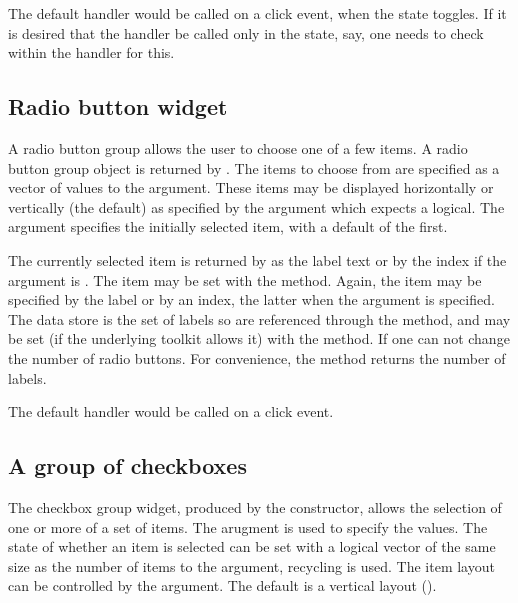 The default handler would be called on a click event, when the state toggles. If it is desired
that the handler be called only in the  state, say, one
needs to check within the handler for this.

\subsection{Radio button widget}
\label{sec:gWidgets-radio-button-widget}

A radio button group allows the user to choose one of a few
items. A radio button group object is returned by
. The items to choose from are specified as a
vector of values to the  argument. These items
may be displayed horizontally or vertically (the default) as specified by the
 argument which expects a logical. The
 argument specifies the initially selected item,
with a default of the first.

The currently selected item is returned by  as
the label text or by the index if the argument  is
. The item may be set with the
 method. Again, the item may be
specified by the label or by an index, the latter when the argument
 is specified. The data store is the set of labels so
are referenced through the \method{[}{gradio} method, and may be set
(if the underlying toolkit allows it) with the
\method{[\ASSIGN}{gradio} method. If  one can not
change the number of radio buttons. For convenience, the
 method returns the number of labels.

The default handler would be called on a click event.

\subsection{A group of checkboxes}
\label{sec:gWidgets-group-checkboxes}


The checkbox group widget, produced by the
 constructor, allows the selection of one
or more of a set of items.  The 
arugment is used to specify the values. The state of whether an item
is selected can be set with a logical vector of the same size as the number of items to the
 argument, recycling is used. The
item layout can be controlled by the
 argument. The default is a vertical layout ().

